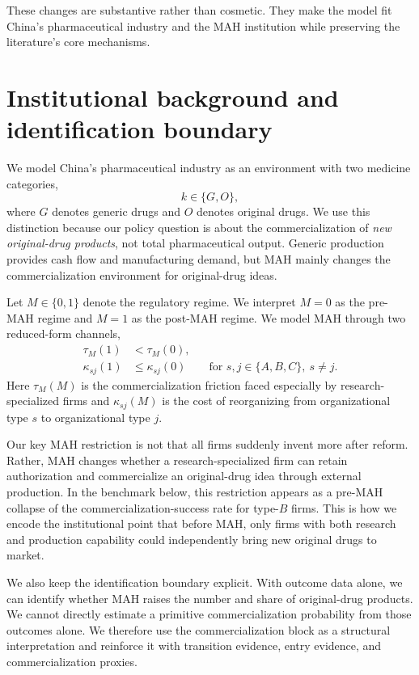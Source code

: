 \documentclass[12pt]{article}
\newcommand{\1}{\mathbf{1}}
\begin{document}
These changes are substantive rather than cosmetic. They make the model fit China's pharmaceutical industry and the MAH institution while preserving the literature's core mechanisms.

\section{Institutional background and identification boundary}

We model China's pharmaceutical industry as an environment with two medicine categories,
\[
k \in \{G,O\},
\]
where $G$ denotes generic drugs and $O$ denotes original drugs. We use this distinction because our policy question is about the commercialization of \emph{new original-drug products}, not total pharmaceutical output. Generic production provides cash flow and manufacturing demand, but MAH mainly changes the commercialization environment for original-drug ideas.

Let $M\in\{0,1\}$ denote the regulatory regime. We interpret $M=0$ as the pre-MAH regime and $M=1$ as the post-MAH regime. We model MAH through two reduced-form channels,
\begin{align}
\tau_M(1) &< \tau_M(0), \label{eq:tauM}\\
\kappa_{sj}(1) &\le \kappa_{sj}(0)
\qquad \text{for } s,j\in\{A,B,C\},\ s\neq j.
\label{eq:kappaM}
\end{align}
Here $\tau_M(M)$ is the commercialization friction faced especially by research-specialized firms and $\kappa_{sj}(M)$ is the cost of reorganizing from organizational type $s$ to organizational type $j$.

Our key MAH restriction is not that all firms suddenly invent more after reform. Rather, MAH changes whether a research-specialized firm can retain authorization and commercialize an original-drug idea through external production. In the benchmark below, this restriction appears as a pre-MAH collapse of the commercialization-success rate for type-$B$ firms. This is how we encode the institutional point that before MAH, only firms with both research and production capability could independently bring new original drugs to market.

We also keep the identification boundary explicit. With outcome data alone, we can identify whether MAH raises the number and share of original-drug products. We cannot directly estimate a primitive commercialization probability from those outcomes alone. We therefore use the commercialization block as a structural interpretation and reinforce it with transition evidence, entry evidence, and commercialization proxies.
\end{document}
